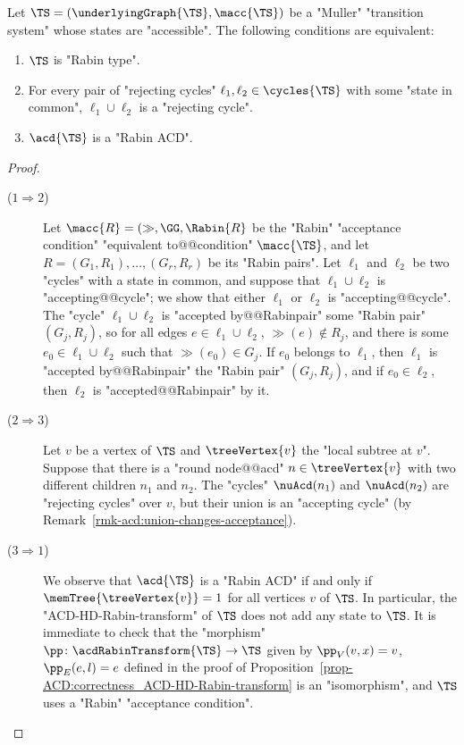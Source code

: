\documentclass{theoretics}
\begin{document}
\begin{proposition}\label{prop-typ:Rabin ACD type}
	Let $\TS = (\underlyingGraph{\TS}, \macc{\TS})$ be a "Muller" "transition system" whose states are "accessible". The following conditions are equivalent:
	\begin{enumerate}
		\item $\TS$ is "Rabin type".
		\item For every pair of "rejecting cycles" $\ell_1, \ell_2\in \cycles{\TS}$  with some "state in common",  $\ell_1\cup \ell_2$ is a "rejecting cycle".
		\item $\acd{\TS}$ is a "Rabin ACD". 
	\end{enumerate}
\end{proposition}
\begin{proof}
	\begin{description}
		\item[($1 \Rightarrow 2$)] 
		Let $\macc{R} = (\gg, \GG, \Rabin{R}$ be the "Rabin" "acceptance condition" "equivalent to@@condition" $\macc{\TS}$, and let $R = (G_1,R_1),\dots,(G_r,R_r)$ be its "Rabin pairs". Let $\ell_1$ and $\ell_2$ be two "cycles" with a state in common, and suppose that $\ell_1\cup \ell_2$ is "accepting@@cycle"; we show that either $\ell_1$ or $\ell_2$ is "accepting@@cycle". The "cycle" $\ell_1\cup \ell_2$ is "accepted by@@Rabinpair" some "Rabin pair" $(G_j,R_j)$, so for all edges $e\in \ell_1\cup \ell_2$, $\gg(e)\notin R_j$, and there is some $e_0\in \ell_1\cup \ell_2$ such that $\gg(e_0)\in G_j$. If $e_0$ belongs to $\ell_1$, then $\ell_1$ is "accepted by@@Rabinpair" the "Rabin pair" $(G_j,R_j)$, and if $e_0\in \ell_2$, then $\ell_2$ is "accepted@@Rabinpair" by it.
		
		\item[($2 \Rightarrow 3$)] Let $v$ be a vertex of $\TS$ and $\treeVertex{v}$ the "local subtree at $v$". Suppose that there is a "round node@@acd" $n\in \treeVertex{v}$ with two different children $n_1$ and $n_2$. The "cycles" $\nuAcd(n_1)$ and $\nuAcd(n_2)$ are "rejecting cycles" over $v$, but their union is an "accepting cycle" (by Remark~\ref{rmk-acd:union-changes-acceptance}).
		
		\item[($3 \Rightarrow 1$)] We observe that $\acd{\TS}$ is a "Rabin ACD" if and only if $\memTree{\treeVertex{v}} = 1$ for all vertices $v$ of $\TS$. In particular, the "ACD-HD-Rabin-transform" of $\TS$ does not add any state to $\TS$. It is immediate to check that the "morphism" $\pp\colon \acdRabinTransform{\TS} \to \TS$ given by $\pp_V(v,x)=v$, $\pp_E(e,l)=e$ defined in the proof of Proposition~\ref{prop-ACD:correctness_ACD-HD-Rabin-transform} is an "isomorphism", and $\TS$ uses a "Rabin" "acceptance condition".\qedhere
	\end{description}
\end{proof}
\end{document}
